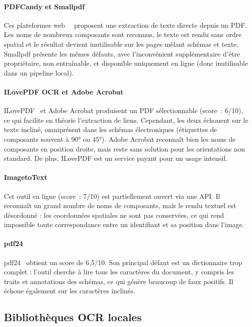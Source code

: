 \documentclass[a4paper,11pt]{article} %
\begin{document}
\paragraph{PDFCandy et Smallpdf}
Ces plateformes web~\cite{pdfcandy}~\cite{smallpdf} proposent une extraction de texte directe depuis
un PDF.
Les noms de nombreux composants sont reconnus, le texte est rendu sans ordre spatial et le résultat devient inutilisable sur les pages mêlant schémas et texte.
Smallpdf présente les mêmes défauts, avec l'inconvénient supplémentaire
d'être propriétaire, non entraînable, et disponible uniquement en ligne (donc
inutilisable dans un pipeline local).

\paragraph{ILovePDF OCR et Adobe Acrobat}
ILovePDF~\cite{ilovepdf} et Adobe Acrobat produisent un PDF sélectionnable
(score~: 6/10), ce qui facilite en théorie l'extraction de liens.
Cependant, les deux échouent sur le texte incliné, omniprésent dans les schémas
électroniques (étiquettes de composants souvent à 90° ou 45°).
Adobe Acrobat reconnaît bien les noms de composants en position droite,
mais reste sans solution pour les orientations non standard.
De plus, ILovePDF est un service payant pour un usage intensif.

\paragraph{ImagetoText}
Cet outil en ligne (score~: 7/10) est partiellement ouvert via une API.
Il reconnaît un grand nombre de noms de composants, mais le rendu textuel est
désordonné : les coordonnées spatiales ne sont pas conservées, ce qui rend
impossible toute correspondance entre un identifiant et sa position dans l'image.

\paragraph{pdf24}
pdf24~\cite{pdf24} obtient un score de 6,5/10.
Son principal défaut est un dictionnaire trop complet : l'outil cherche à lire
tous les caractères du document, y compris les traits et annotations des schémas,
ce qui génère beaucoup de faux positifs.
Il échoue également sur les caractères inclinés.

\subsection{Bibliothèques OCR locales}
\end{document}
